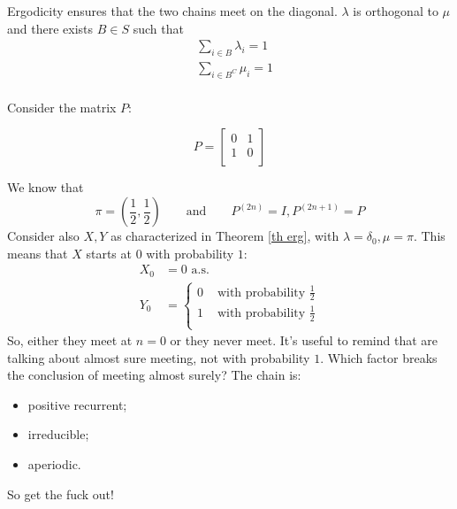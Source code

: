 \documentclass{article}
\begin{document}
\begin{remark}
        Ergodicity ensures that the two chains meet on the diagonal. $\lambda$ is orthogonal to $\mu$ and there exists $B \in S$ such that 
    \begin{align*}
        &\sum_{i \in B} \lambda_i = 1 \\
        &\sum_{i \in B^C} \mu_i = 1 \\
    \end{align*}
\end{remark}
\begin{example}
     Consider the matrix $P$:\\
    \begin{minipage}{0.5\textwidth}
     \center
        \[P=\begin{bmatrix}
        0 & 1 \\
        1 & 0 \\
    \end{bmatrix}\]
    \end{minipage} \hfill
    \begin{minipage}{0.45\textwidth}
    \begin{figure}[H]
            \centering
        \end{figure}
    \end{minipage}
    We know that \[
        \pi = (\frac{1}{2}, \frac{1}{2}) \qquad\text{and}\qquad P^{(2n)} = I, P^{(2n+1)} = P \]
    Consider also $X, Y$ as characterized in Theorem \ref{th erg}, with $\lambda = \delta_0, \mu = \pi$. This means that $X$ starts at $0$ with probability $1$:
    \begin{align*}
        X_0 &= 0 \text{ a.s.} \\
        Y_0 &=
        \begin{cases}
            0 &\text{ with probability } \frac{1}{2} \\
            1 &\text{ with probability } \frac{1}{2} \\
        \end{cases}
    \end{align*}
    So, either they meet at $n = 0$ or they never meet.
It's useful to remind that are talking about almost sure meeting, not with probability $1$. Which factor breaks the conclusion of meeting almost surely? The chain is:
\begin{itemize}
    \item positive recurrent;
    \item irreducible;
    \item {} aperiodic.
\end{itemize}
So get the fuck out!
\end{example}
\end{document}
